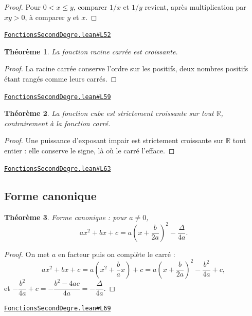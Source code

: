 \documentclass[11pt,a4paper]{article}
\theoremstyle{definition}
\theoremstyle{plain}
\newtheorem{theoreme}{Théorème}
\newcommand{\source}[2]{\par\smallskip\noindent\hfill{\footnotesize\href{#1}{\texttt{#2}}}\par\smallskip}
\begin{document}
\begin{proof}
Pour $0 < x \le y$, comparer $1/x$ et $1/y$ revient, après multiplication par $xy > 0$,
à comparer $y$ et $x$.
\end{proof}
\source{https://github.com/Commutator-IO/learn-lean/blob/main/cours/02-lycee/02-fonctions-second-degre/FonctionsSecondDegre.lean\#L52}{FonctionsSecondDegre.lean\#L52}

\begin{theoreme}
La fonction racine carrée est croissante.
\end{theoreme}

\begin{proof}
La racine carrée conserve l'ordre sur les positifs, deux nombres positifs étant rangés
comme leurs carrés.
\end{proof}
\source{https://github.com/Commutator-IO/learn-lean/blob/main/cours/02-lycee/02-fonctions-second-degre/FonctionsSecondDegre.lean\#L59}{FonctionsSecondDegre.lean\#L59}

\begin{theoreme}
La fonction cube est strictement croissante sur tout $\mathbb{R}$, contrairement à la
fonction carré.
\end{theoreme}

\begin{proof}
Une puissance d'exposant impair est strictement croissante sur $\mathbb{R}$ tout entier :
elle conserve le signe, là où le carré l'efface.
\end{proof}
\source{https://github.com/Commutator-IO/learn-lean/blob/main/cours/02-lycee/02-fonctions-second-degre/FonctionsSecondDegre.lean\#L63}{FonctionsSecondDegre.lean\#L63}

\subsection{Forme canonique}

\begin{theoreme}
Forme canonique : pour $a \ne 0$,
\[ ax^2 + bx + c = a\left(x + \frac{b}{2a}\right)^2 - \frac{\Delta}{4a} . \]
\end{theoreme}

\begin{proof}
On met $a$ en facteur puis on complète le carré :
\[ ax^2 + bx + c = a\left(x^2 + \frac{b}{a}x\right) + c
   = a\left(x + \frac{b}{2a}\right)^2 - \frac{b^2}{4a} + c , \]
et $-\dfrac{b^2}{4a} + c = -\dfrac{b^2 - 4ac}{4a} = -\dfrac{\Delta}{4a}$.
\end{proof}
\source{https://github.com/Commutator-IO/learn-lean/blob/main/cours/02-lycee/02-fonctions-second-degre/FonctionsSecondDegre.lean\#L69}{FonctionsSecondDegre.lean\#L69}
\end{document}
